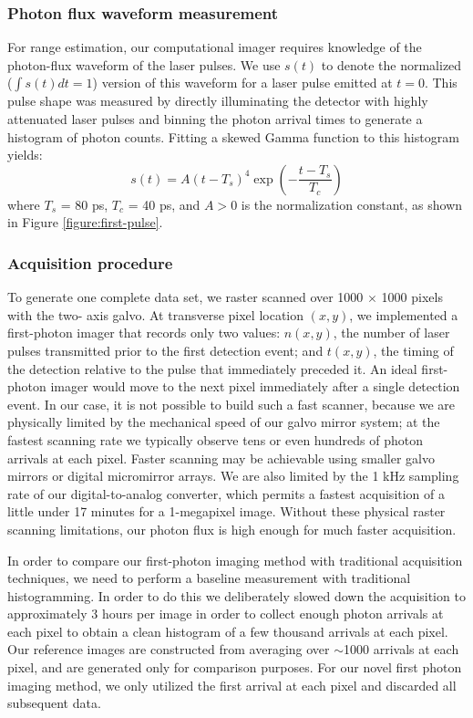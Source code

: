 \subsubsection{Photon flux waveform measurement}
For range estimation, our computational imager requires knowledge of the photon-flux waveform of the laser pulses. We use $s(t)$ to denote the normalized ($\int s(t) dt = 1$) version of this
waveform for a laser pulse emitted at $t = 0$. This pulse shape was measured by directly
illuminating the detector with highly attenuated laser pulses and binning the photon arrival times
to generate a histogram of photon counts. Fitting a skewed Gamma function to this histogram
yields:
\begin{equation}
s(t) = A (t - T_s)^4 \exp \left( -\frac{t-T_s}{T_c} \right)
\end{equation}
where $T_s$ = 80 ps, $T_c$ = 40 ps, and $A>0$ is the normalization constant, as shown in Figure \ref{figure:first-pulse}.

\subsubsection{Acquisition procedure}
To generate one complete data set, we raster scanned over 1000 $\times$ 1000 pixels with the two-
axis galvo. At transverse pixel location $(x, y)$, we implemented a first-photon imager that records only two values: $n(x, y)$, the number of laser pulses transmitted prior to the first detection event; and $t(x, y)$, the timing of the detection relative to the pulse that immediately preceded it. An ideal first-photon imager would move to the next pixel immediately after a single detection event.
In our case, it is not possible to build such a fast scanner, because we are physically limited by the mechanical speed of our galvo mirror system; at the fastest scanning rate we typically observe tens or even hundreds of photon arrivals at each pixel. Faster scanning may be achievable using smaller galvo mirrors or digital micromirror arrays. We are also limited by the 1 kHz sampling rate of our digital-to-analog converter, which permits a fastest acquisition of a little under 17 minutes for a 1-megapixel image. Without these physical raster scanning limitations, our photon flux is high enough for much faster acquisition.

In order to compare our first-photon imaging method with traditional acquisition techniques, we need to perform a baseline measurement with traditional histogramming. In order to do this we deliberately slowed down the acquisition to approximately 3 hours per image in order to collect enough photon arrivals at each pixel to obtain a clean histogram of a few thousand arrivals at each pixel. Our reference images are constructed from averaging over $\sim$1000 arrivals at each pixel, and are generated only for comparison purposes. For our novel first photon imaging method, we only utilized the first arrival at each pixel and discarded all subsequent data.

